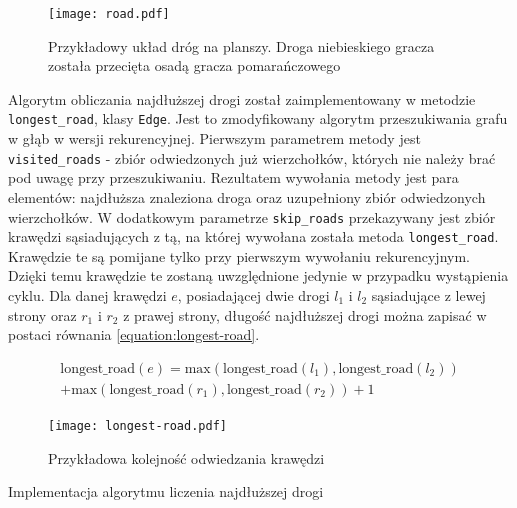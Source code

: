 \documentclass[a4paper,12pt]{article}
\providecommand{\imref}[1]{Rys. \ref{#1}} %
\begin{document}
\begin{figure}[ht]
  \begin{center}
    \texttt{[image: road.pdf]}
  \end{center}
  \caption{Przykładowy układ dróg na planszy. Droga niebieskiego
    gracza została przecięta osadą gracza pomarańczowego}
  \label{road}
\end{figure}

Algorytm obliczania najdłuższej drogi został zaimplementowany w
metodzie \texttt{longest\_road}, klasy \texttt{Edge}. Jest to
zmodyfikowany algorytm przeszukiwania grafu w głąb w wersji
rekurencyjnej. Pierwszym parametrem metody jest
\texttt{visited\_roads} - zbiór odwiedzonych już wierzchołków, których
nie należy brać pod uwagę przy przeszukiwaniu. Rezultatem wywołania
metody jest para elementów: najdłuższa znaleziona droga oraz
uzupełniony zbiór odwiedzonych wierzchołków. W dodatkowym parametrze
\texttt{skip\_roads} przekazywany jest zbiór krawędzi sąsiadujących z
tą, na której wywołana została metoda
\texttt{longest\_road}. Krawędzie te są pomijane tylko przy pierwszym
wywołaniu rekurencyjnym. Dzięki temu krawędzie te zostaną uwzględnione
jedynie w przypadku wystąpienia cyklu. Dla danej krawędzi $e$,
posiadającej dwie drogi $l_1$ i $l_2$ sąsiadujące z lewej strony oraz
$r_1$ i $r_2$ z prawej strony, długość najdłuższej drogi można zapisać
w postaci równania \ref{equation:longest-road}.

\begin{equation}
  \begin{aligned}
    \text{longest\_road}(e) = \text{max}(\text{longest\_road}(l_1),
    \text{longest\_road}(l_2)) \\
    + \text{max}(\text{longest\_road}(r_1), \text{longest\_road}(r_2))
    + 1
  \end{aligned}
  \label{equation:longest-road}
\end{equation}


\begin{figure}[ht]
  \begin{center}
    \texttt{[image: longest-road.pdf]}
  \end{center}
  \caption{Przykładowa kolejność odwiedzania krawędzi}
  \label{longest-road}
\end{figure}

\begin{listing}
  
  \caption{Implementacja algorytmu liczenia najdłuższej drogi}
  \label{listing:edge}
\end{listing}
\end{document}
